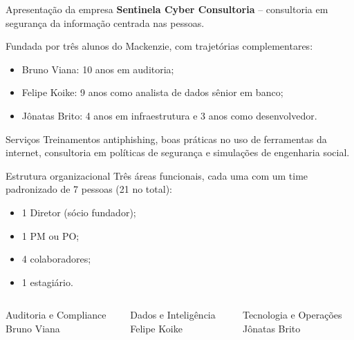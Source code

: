 \documentclass[aspectratio=169,12pt]{beamer}
\begin{document}
\begin{frame}{Apresentação da empresa}
  \textbf{Sentinela Cyber Consultoria} -- consultoria em segurança da
  informação centrada nas pessoas.

  \vspace{0.3cm}
  Fundada por três alunos do Mackenzie, com trajetórias complementares:
  \begin{itemize}
    \item Bruno Viana: 10 anos em auditoria;
    \item Felipe Koike: 9 anos como analista de dados sênior em banco;
    \item Jônatas Brito: 4 anos em infraestrutura e 3 anos como desenvolvedor.
  \end{itemize}

  \vspace{0.2cm}
  \begin{block}{Serviços}
    Treinamentos antiphishing, boas práticas no uso de ferramentas da internet,
    consultoria em políticas de segurança e simulações de engenharia social.
  \end{block}
\end{frame}

\begin{frame}{Estrutura organizacional}
  Três áreas funcionais, cada uma com um time padronizado de 7 pessoas (21 no total):
  \begin{itemize}
    \item 1 Diretor (sócio fundador);
    \item 1 PM ou PO;
    \item 4 colaboradores;
    \item 1 estagiário.
  \end{itemize}

  \vspace{0.2cm}
  \begin{columns}[t]
      \begin{block}{Auditoria e Compliance}
        Bruno Viana
      \end{block}
      \begin{block}{Dados e Inteligência}
        Felipe Koike
      \end{block}
      \begin{block}{Tecnologia e Operações}
        Jônatas Brito
      \end{block}
  \end{columns}
\end{frame}
\end{document}
